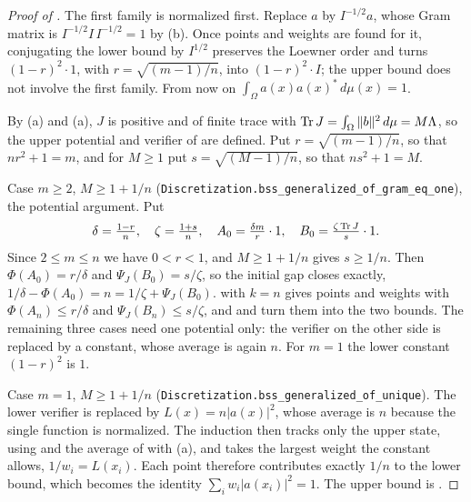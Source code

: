 \begin{proof}[Proof of ]
\leanok
{}
The first family is normalized first. Replace $a$ by $I^{-1/2} a$, whose Gram matrix is
$I^{-1/2} I \, I^{-1/2} = 1$ by (b). Once points and weights are
found for it, conjugating the lower bound by $I^{1/2}$ preserves the Loewner order and
turns $(1 - r)^2 \cdot 1$, with $r = \sqrt{(m-1)/n}$, into $(1 - r)^2 \cdot I$; the upper
bound does not involve the first family. From now on
$\int_\Omega a(x) a(x)^* \, d\mu(x) = 1$.

By (a) and (a), $J$ is positive and
of finite trace with
$\operatorname{Tr} J = \int_\Omega \|b\|^2 \, d\mu = M \Lambda$, so the upper potential and verifier of
 are defined. Put $r = \sqrt{(m-1)/n}$, so that
$n r^2 + 1 = m$, and for $M \geq 1$ put $s = \sqrt{(M-1)/n}$, so that $n s^2 + 1 = M$.

Case $m \geq 2$, $M \geq 1 + 1/n$ (\texttt{Discretization.bss\_generalized\_of\_gram\_eq\_one}),
the potential argument. Put
\[
  \delta = \tfrac{1-r}{n}, \quad \zeta = \tfrac{1+s}{n}, \quad
  A_0 = \tfrac{\delta m}{r} \cdot 1, \quad B_0 = \tfrac{\zeta \operatorname{Tr} J}{s} \cdot 1 .
\]
Since $2 \leq m \leq n$ we have $0 < r < 1$, and $M \geq 1 + 1/n$ gives $s \geq 1/n$.
Then $\Phi(A_0) = r/\delta$ and $\Psi_J(B_0) = s/\zeta$, so the initial gap closes
exactly, $1/\delta - \Phi(A_0) = n = 1/\zeta + \Psi_J(B_0)$.
 with $k = n$ gives points and weights with
$\Phi(A_n) \leq r/\delta$ and $\Psi_J(B_n) \leq s/\zeta$, and
 and  turn them into
the two bounds. The remaining three cases need one potential only: the verifier on the
other side is replaced by a constant, whose average is again $n$. For $m = 1$ the lower
constant $(1 - r)^2$ is $1$.

Case $m = 1$, $M \geq 1 + 1/n$ (\texttt{Discretization.bss\_generalized\_of\_unique}). The
lower verifier is replaced by $L(x) = n |a(x)|^2$, whose average is $n$ because the single
function is normalized. The induction then tracks only the upper state, using
 and the average of  with
(a), and takes the largest weight the constant allows,
$1/w_i = L(x_i)$. Each point therefore contributes exactly $1/n$ to the lower bound, which
becomes the identity $\sum_i w_i |a(x_i)|^2 = 1$. The upper bound is
.


\end{proof}
